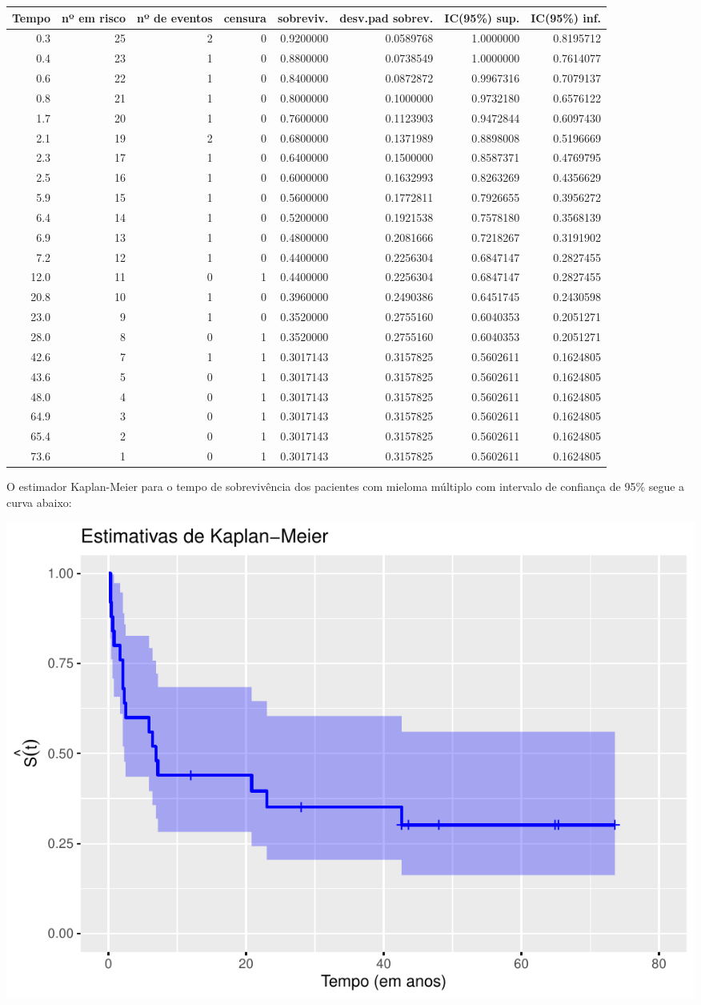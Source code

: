 \documentclass[]{article}
\begin{document}
\begin{longtable}[]{@{}rrrrrrrr@{}}
\toprule
Tempo & nº em risco & nº de eventos & censura & sobreviv. & desv.pad
sobrev. & IC(95\%) sup. & IC(95\%) inf.\tabularnewline
\midrule
\endhead
0.3 & 25 & 2 & 0 & 0.9200000 & 0.0589768 & 1.0000000 &
0.8195712\tabularnewline
0.4 & 23 & 1 & 0 & 0.8800000 & 0.0738549 & 1.0000000 &
0.7614077\tabularnewline
0.6 & 22 & 1 & 0 & 0.8400000 & 0.0872872 & 0.9967316 &
0.7079137\tabularnewline
0.8 & 21 & 1 & 0 & 0.8000000 & 0.1000000 & 0.9732180 &
0.6576122\tabularnewline
1.7 & 20 & 1 & 0 & 0.7600000 & 0.1123903 & 0.9472844 &
0.6097430\tabularnewline
2.1 & 19 & 2 & 0 & 0.6800000 & 0.1371989 & 0.8898008 &
0.5196669\tabularnewline
2.3 & 17 & 1 & 0 & 0.6400000 & 0.1500000 & 0.8587371 &
0.4769795\tabularnewline
2.5 & 16 & 1 & 0 & 0.6000000 & 0.1632993 & 0.8263269 &
0.4356629\tabularnewline
5.9 & 15 & 1 & 0 & 0.5600000 & 0.1772811 & 0.7926655 &
0.3956272\tabularnewline
6.4 & 14 & 1 & 0 & 0.5200000 & 0.1921538 & 0.7578180 &
0.3568139\tabularnewline
6.9 & 13 & 1 & 0 & 0.4800000 & 0.2081666 & 0.7218267 &
0.3191902\tabularnewline
7.2 & 12 & 1 & 0 & 0.4400000 & 0.2256304 & 0.6847147 &
0.2827455\tabularnewline
12.0 & 11 & 0 & 1 & 0.4400000 & 0.2256304 & 0.6847147 &
0.2827455\tabularnewline
20.8 & 10 & 1 & 0 & 0.3960000 & 0.2490386 & 0.6451745 &
0.2430598\tabularnewline
23.0 & 9 & 1 & 0 & 0.3520000 & 0.2755160 & 0.6040353 &
0.2051271\tabularnewline
28.0 & 8 & 0 & 1 & 0.3520000 & 0.2755160 & 0.6040353 &
0.2051271\tabularnewline
42.6 & 7 & 1 & 1 & 0.3017143 & 0.3157825 & 0.5602611 &
0.1624805\tabularnewline
43.6 & 5 & 0 & 1 & 0.3017143 & 0.3157825 & 0.5602611 &
0.1624805\tabularnewline
48.0 & 4 & 0 & 1 & 0.3017143 & 0.3157825 & 0.5602611 &
0.1624805\tabularnewline
64.9 & 3 & 0 & 1 & 0.3017143 & 0.3157825 & 0.5602611 &
0.1624805\tabularnewline
65.4 & 2 & 0 & 1 & 0.3017143 & 0.3157825 & 0.5602611 &
0.1624805\tabularnewline
73.6 & 1 & 0 & 1 & 0.3017143 & 0.3157825 & 0.5602611 &
0.1624805\tabularnewline
\bottomrule
\end{longtable}

O estimador Kaplan-Meier para o tempo de sobrevivência dos pacientes com
mieloma múltiplo com intervalo de confiança de 95\% segue a curva
abaixo:

\begin{center}\includegraphics[width=0.8\linewidth]{Lista_3_files/figure-latex/unnamed-chunk-2-1} \end{center}
\end{document}
